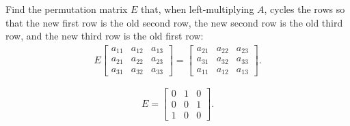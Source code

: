 \documentclass[reqno, answers]{exam}
\begin{document}
\begin{questions}
\question[5]
    Find the permutation matrix $E$ that, when left-multiplying $A$, cycles the rows so that the new first row is the old second row, the new second row is the old third row, and the new third row is the old first row:
    \begin{align*}
      E \begin{bmatrix}
          a_{11} & a_{12} & a_{13} \\
          a_{21} & a_{22} & a_{23} \\
          a_{31} & a_{32} & a_{33}
        \end{bmatrix}
      =
      \begin{bmatrix}
        a_{21} & a_{22} & a_{23} \\
        a_{31} & a_{32} & a_{33} \\
        a_{11} & a_{12} & a_{13}
      \end{bmatrix}.
    \end{align*}
    \begin{solution}
      $$E = \begin{bmatrix}
          0 & 1 & 0 \\
          0 & 0 & 1 \\
          1 & 0 & 0
        \end{bmatrix}.
      $$
    \end{solution}


\end{questions}
\end{document}

